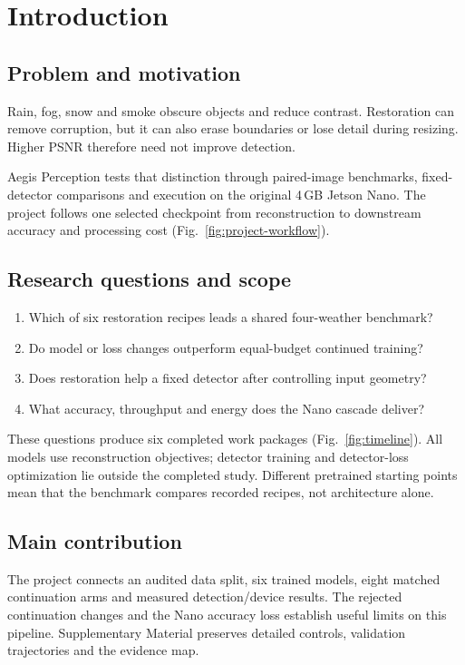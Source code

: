 \section{Introduction}
\label{sec:introduction}
\subsection{Problem and motivation}
Rain, fog, snow and smoke obscure objects and reduce contrast. Restoration
can remove corruption, but it can also erase boundaries or lose detail during
resizing. Higher PSNR therefore need not improve detection.

Aegis Perception tests that distinction through paired-image benchmarks,
fixed-detector comparisons and execution on the original 4\,GB Jetson Nano.
The project follows one selected checkpoint from reconstruction to downstream
accuracy and processing cost (Fig.~\ref{fig:project-workflow}).

\subsection{Research questions and scope}
\begin{enumerate}
\item Which of six restoration recipes leads a shared four-weather benchmark?
\item Do model or loss changes outperform equal-budget continued training?
\item Does restoration help a fixed detector after controlling input geometry?
\item What accuracy, throughput and energy does the Nano cascade deliver?
\end{enumerate}
These questions produce six completed work packages (Fig.~\ref{fig:timeline}).
All models use reconstruction objectives; detector training and detector-loss
optimization lie outside the completed study. Different pretrained starting
points mean that the benchmark compares recorded recipes, not architecture alone.

\subsection{Main contribution}
The project connects an audited data split, six trained models, eight matched
continuation arms and measured detection/device results. The rejected
continuation changes and the Nano accuracy loss establish useful limits on
this pipeline. Supplementary Material preserves detailed controls, validation
trajectories and the evidence map.
